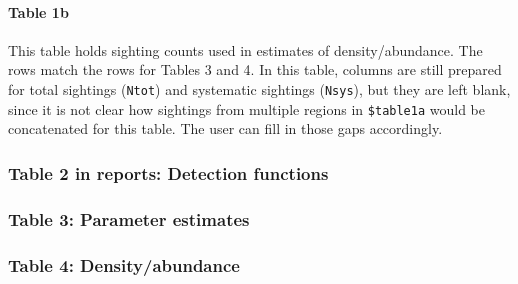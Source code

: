 \documentclass[
]{book}
\newenvironment{Shaded}{\begin{snugshade}}{\end{snugshade}}
\newcommand{\DataTypeTok}[1]{\textcolor[rgb]{0.13,0.29,0.53}{#1}}
\newcommand{\KeywordTok}[1]{\textcolor[rgb]{0.13,0.29,0.53}{\textbf{#1}}}
\newcommand{\NormalTok}[1]{#1}
\newcommand{\OperatorTok}[1]{\textcolor[rgb]{0.81,0.36,0.00}{\textbf{#1}}}
\newcommand{\StringTok}[1]{\textcolor[rgb]{0.31,0.60,0.02}{#1}}
\begin{document}
\hypertarget{table-1b}{%
\paragraph{Table 1b}\label{table-1b}}

This table holds sighting counts used in estimates of density/abundance. The rows match the rows for Tables 3 and 4. In this table, columns are still prepared for total sightings (\texttt{Ntot}) and systematic sightings (\texttt{Nsys}), but they are left blank, since it is not clear how sightings from multiple regions in \texttt{\$table1a} would be concatenated for this table. The user can fill in those gaps accordingly.

\begin{Shaded}
\end{Shaded}

\hypertarget{table-2-in-reports-detection-functions}{%
\subsubsection*{Table 2 in reports: Detection functions}\label{table-2-in-reports-detection-functions}}

\hypertarget{table-3-parameter-estimates}{%
\subsubsection*{Table 3: Parameter estimates}\label{table-3-parameter-estimates}}

\hypertarget{table-4-densityabundance}{%
\subsubsection*{Table 4: Density/abundance}\label{table-4-densityabundance}}
\end{document}
